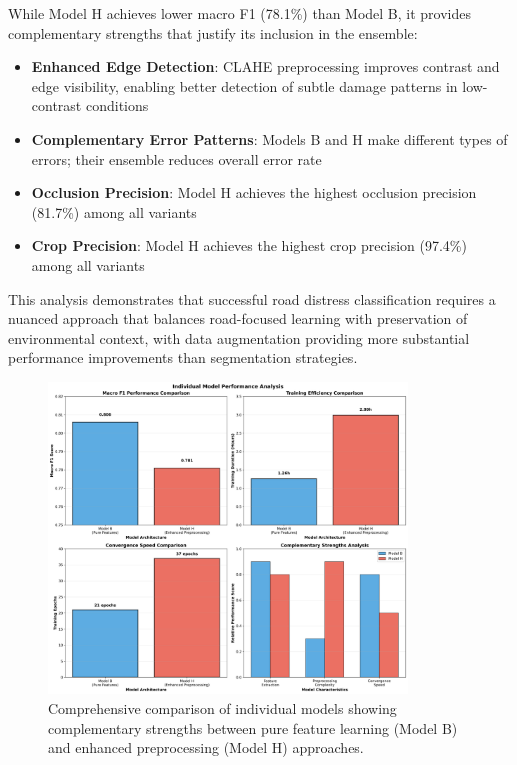 \documentclass[12pt]{article}
\begin{document}
While Model H achieves lower macro F1 (78.1\%) than Model B, it provides complementary strengths that justify its inclusion in the ensemble:
\begin{itemize}[itemsep=1pt,parsep=0pt,topsep=2pt]
\item \textbf{Enhanced Edge Detection}: CLAHE preprocessing improves contrast and edge visibility, enabling better detection of subtle damage patterns in low-contrast conditions
\item \textbf{Complementary Error Patterns}: Models B and H make different types of errors; their ensemble reduces overall error rate
\item \textbf{Occlusion Precision}: Model H achieves the highest occlusion precision (81.7\%) among all variants
\item \textbf{Crop Precision}: Model H achieves the highest crop precision (97.4\%) among all variants
\end{itemize}

This analysis demonstrates that successful road distress classification requires a nuanced approach that balances road-focused learning with preservation of environmental context, with data augmentation providing more substantial performance improvements than segmentation strategies.

\begin{figure}[!htb]
\centering
\includegraphics[width=0.85\textwidth]{images/model_comparison_detailed.png}
\caption{Comprehensive comparison of individual models showing complementary strengths between pure feature learning (Model B) and enhanced preprocessing (Model H) approaches.}
\end{figure}
\end{document}
